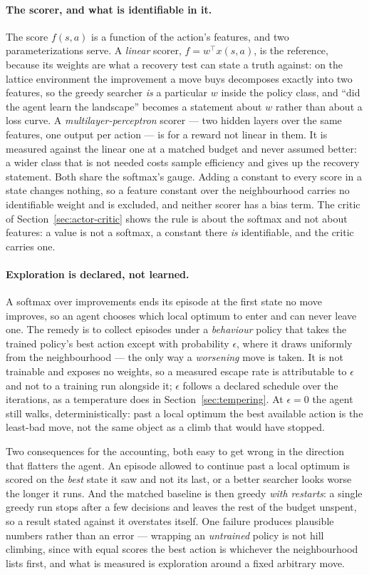 \documentclass[11pt,a4paper]{article}
\begin{document}
\paragraph{The scorer, and what is identifiable in it.}
The score $f(s, a)$ is a function of the action's features, and two
parameterizations serve. A \emph{linear} scorer, $f = w^{\top} x(s, a)$, is the
reference, because its weights are what a recovery test can state a truth
against: on the lattice environment the improvement a move buys decomposes
exactly into two features, so the greedy searcher \emph{is} a particular $w$
inside the policy class, and ``did the agent learn the landscape'' becomes a
statement about $w$ rather than about a loss curve. A
\emph{multilayer-perceptron} scorer --- two hidden layers over the same
features, one output per action --- is for a reward not linear in them. It is
measured against the linear one at a matched budget and never assumed better:
a wider class that is not needed costs sample efficiency and gives up the
recovery statement. Both share the softmax's gauge. Adding a constant to every
score in a state changes nothing, so a feature constant over the neighbourhood
carries no identifiable weight and is excluded, and neither scorer has a bias
term. The critic of Section~\ref{sec:actor-critic} shows the rule is about the
softmax and not about features: a value is not a softmax, a constant there
\emph{is} identifiable, and the critic carries one.

\paragraph{Exploration is declared, not learned.}
A softmax over improvements ends its episode at the first state no move
improves, so an agent chooses which local optimum to enter and can never
leave one. The remedy is to collect episodes under a \emph{behaviour} policy
that takes the trained policy's best action except with probability
$\epsilon$, where it draws uniformly from the neighbourhood --- the only way a
\emph{worsening} move is taken. It is not trainable and exposes no weights, so
a measured escape rate is attributable to $\epsilon$ and not to a training run
alongside it; $\epsilon$ follows a declared schedule over the iterations, as a
temperature does in Section~\ref{sec:tempering}. At $\epsilon = 0$ the agent
still walks, deterministically: past a local optimum the best available action
is the least-bad move, not the same object as a climb that would have stopped.

Two consequences for the accounting, both easy to get wrong in the direction
that flatters the agent. An episode allowed to continue past a local optimum is
scored on the \emph{best} state it saw and not its last, or a better searcher
looks worse the longer it runs. And the matched baseline is then greedy
\emph{with restarts}: a single greedy run stops after a few decisions and
leaves the rest of the budget unspent, so a result stated against it overstates
itself. One failure produces plausible numbers rather than an error ---
wrapping an \emph{untrained} policy is not hill climbing, since with equal
scores the best action is whichever the neighbourhood lists first, and what is
measured is exploration around a fixed arbitrary move.
\end{document}
